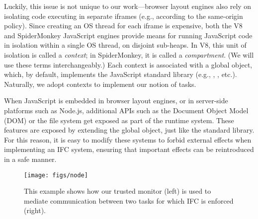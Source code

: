 \documentclass{llncs}
\begin{document}
Luckily, this issue is not unique to our work---browser layout engines
also rely on isolating code executing in separate iframes (e.g., according to the
same-origin policy).
Since creating an OS thread for each iframe is expensive, both
the V8 and SpiderMonkey JavaScript engines provide means for running
JavaScript code in isolation within a single OS thread,
on disjoint sub-heaps.
In V8, this unit of isolation is called a \emph{context}; in
SpiderMonkey, it is called a \emph{compartment}.
(We will use these terms interchangeably.)
Each context is associated with a global object, which, by
default, implements the JavaScript standard library (e.g.,
, , etc.).
Naturally, we adopt contexts to implement our notion of tasks.


When JavaScript is embedded in browser layout engines,
or in server-side platforms such as Node.js,
additional APIs such as the Document Object Model (DOM) or the file
system get exposed as part of the runtime system.
These features are exposed by extending the global object, just like
the standard library.  For this reason, it is easy to modify
these systems to forbid external effects when implementing
an IFC system, ensuring that important effects can be reintroduced in a safe manner.



\begin{figure}[t]
\centerline{\texttt{[image: figs/node]}}
\caption{\label{fig:node}
This example shows how our trusted monitor (left) is used to mediate
communication between two tasks for which IFC is enforced (right).}
\end{figure}
\end{document}
